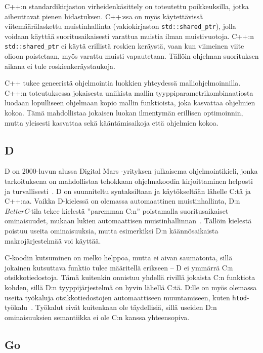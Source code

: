 C++:n standardikirjaston virheidenkäsittely on toteutettu poikkeuksilla, jotka
aiheuttavat pienen hidastuksen. C++:ssa on myös käytettävissä
viitemäärälaskettu muistinhallinta (vakiokirjaston
\texttt{std::shared\_ptr}), jolla voidaan käyttää suoritusaikaisesti varattua
muistia ilman muistivuotoja. C++:n \texttt{std::shared\_ptr} ei käytä erillistä
roskien keräystä, vaan kun viimeinen viite olioon poistetaan, myös varattu
muisti vapautetaan. Tällöin ohjelman suorituksen aikana ei tule
roskienkeräystaukoja.

C++ tukee geneeristä ohjelmointia luokkien
yhteydessä malliohjelmoinnilla. C++:n
toteutuksessa jokaisesta uniikista mallin tyyppiparametrikombinaatiosta luodaan
lopulliseen ohjelmaan kopio mallin funktioista, joka kasvattaa ohjelmien kokoa.
Tämä mahdollistaa jokaisen luokan ilmentymän erillisen
optimoinnin, mutta yleisesti kasvattaa sekä kääntämisaikoja että ohjelmien
kokoa.

\subsection{D}

D on 2000-luvun alussa Digital Mars -yrityksen julkaisema ohjelmointikieli,
jonka tarkoituksena on mahdollistaa tehokkaan ohjelmakoodin kirjoittaminen
helposti ja turvallisesti~\citep{dhistory}. D on suunniteltu syntaksiltaan ja
käytökseltään lähelle C:tä ja C++:aa. Vaikka D-kielessä on olemassa
automaattinen muistinhallinta, D:n \emph{BetterC}-tila tekee kielestä
''paremman C:n'' poistamalla suoritusaikaiset ominaisuudet, mukaan lukien
automaattisen muistinhallinnan~\citep{dbetterc}. Tällöin kielestä poistuu
useita ominaisuuksia, mutta esimerkiksi D:n käännösaikaista makrojärjestelmää
voi käyttää.

C-koodin kutsuminen on melko helppoa, mutta ei aivan saumatonta, sillä jokainen
kutsuttava funktio tulee määritellä erikseen -- D ei ymmärrä C:n
otsikkotiedostoja. Tämä kuitenkin onnistuu yhdellä rivillä jokaista C:n
funktiota kohden, sillä D:n tyyppijärjestelmä on hyvin lähellä C:tä. D:lle on
myös olemassa useita työkaluja otsikkotiedostojen automaattiseen muuntamiseen,
kuten \texttt{htod}-työkalu~\citep{htod}. Työkalut eivät kuitenkaan ole
täydellisiä, sillä useiden D:n ominaisuuksien semantiikka ei ole C:n kanssa
yhteensopiva.

\subsection{Go}

